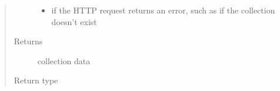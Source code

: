 \documentclass[letterpaper,10pt,english]{sphinxmanual}
\begin{document}
\begin{fulllineitems}
\begin{fulllineitems}
\begin{quote}
\begin{description}
\begin{itemize}
\item {} 
\sphinxAtStartPar
{\hyperref[\detokenize{autoapi/pine/client/exceptions/index:pine.client.exceptions.PineClientHttpException}]{}} \textendash{} if the HTTP request returns an error, such as if the
collection doesn’t exist

\end{itemize}

\item[{Returns}] \leavevmode
\sphinxAtStartPar
collection data

\item[{Return type}] \leavevmode
\sphinxAtStartPar
{}

\end{description}\end{quote}

\end{fulllineitems}


\end{fulllineitems}

\end{document}
